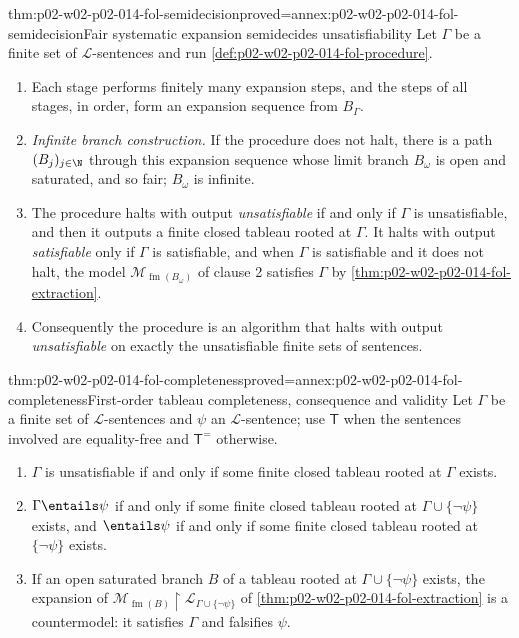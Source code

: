\begin{hbtheorem}{thm:p02-w02-p02-014-fol-semidecision}{proved=annex:p02-w02-p02-014-fol-semidecision}{Fair systematic expansion semidecides unsatisfiability}
Let \(\Gamma\) be a finite set of \(\mathcal L\)-sentences and run
\cref{def:p02-w02-p02-014-fol-procedure}.
\begin{enumerate}
  \item Each stage performs finitely many expansion steps, and the steps of
        all stages, in order, form an expansion sequence from \(B_\Gamma\).
  \item \emph{Infinite branch construction.}  If the procedure does not
        halt, there is a path \((B_j)_{j\in\N}\) through this expansion
        sequence whose limit branch \(B_\omega\) is open and saturated, and
        so fair; \(B_\omega\) is infinite.
  \item The procedure halts with output \emph{unsatisfiable} if and only if
        \(\Gamma\) is unsatisfiable, and then it outputs a finite closed
        tableau rooted at \(\Gamma\).  It halts with output
        \emph{satisfiable} only if \(\Gamma\) is satisfiable, and when
        \(\Gamma\) is satisfiable and it does not halt, the model
        \(\mathcal M_{\operatorname{fm}(B_\omega)}\) of clause 2 satisfies \(\Gamma\) by
        \cref{thm:p02-w02-p02-014-fol-extraction}.
  \item Consequently the procedure is an algorithm that halts with output
        \emph{unsatisfiable} on exactly the unsatisfiable finite sets of
        sentences.
\end{enumerate}
\end{hbtheorem}

\begin{hbcorollary}{thm:p02-w02-p02-014-fol-completeness}{proved=annex:p02-w02-p02-014-fol-completeness}{First-order tableau completeness, consequence and validity}
Let \(\Gamma\) be a finite set of \(\mathcal L\)-sentences and \(\psi\) an
\(\mathcal L\)-sentence; use \(\mathsf T\) when the sentences involved are
equality-free and \(\mathsf T^{=}\) otherwise.
\begin{enumerate}
  \item \(\Gamma\) is unsatisfiable if and only if some finite closed
        tableau rooted at \(\Gamma\) exists.
  \item \(\Gamma\entails\psi\) if and only if some finite closed tableau
        rooted at \(\Gamma\cup\{\neg\psi\}\) exists, and \(\entails\psi\) if
        and only if some finite closed tableau rooted at \(\{\neg\psi\}\)
        exists.
  \item If an open saturated branch \(B\) of a tableau rooted at
        \(\Gamma\cup\{\neg\psi\}\) exists, the expansion of
        \(\mathcal M_{\operatorname{fm}(B)}\restriction\mathcal L_{\Gamma\cup\{\neg\psi\}}\) of
        \cref{thm:p02-w02-p02-014-fol-extraction} is a countermodel:
        it satisfies \(\Gamma\) and falsifies \(\psi\).
\end{enumerate}
\end{hbcorollary}

